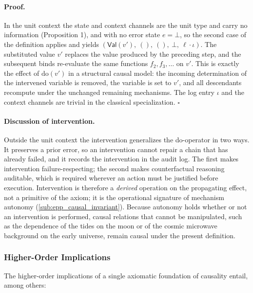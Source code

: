 \paragraph{Proof.}
In the unit context the state and context channels are the unit type and carry no information (Proposition 1), and with no error state $e = \bot$, so the second case of the definition applies and yields $(\mathsf{Val}(v'),\ (),\ (),\ \bot,\ \ell \cdot \iota)$. The substituted value $v'$ replaces the value produced by the preceding step, and the subsequent binds re-evaluate the same functions $f_2, f_3, \ldots$ on $v'$. This is exactly the effect of $\mathrm{do}(v')$ in a structural causal model: the incoming determination of the intervened variable is removed, the variable is set to $v'$, and all descendants recompute under the unchanged remaining mechanisms\cite{pearl2000causality}. The log entry $\iota$ and the context channels are trivial in the classical specialization. $\square$

\paragraph{Discussion of intervention.}
Outside the unit context the intervention generalizes the do-operator in two ways. It preserves a prior error, so an intervention cannot repair a chain that has already failed, and it records the intervention in the audit log. The first makes intervention failure-respecting; the second makes counterfactual reasoning auditable, which is required wherever an action must be justified before execution. Intervention is therefore a \emph{derived} operation on the propagating effect, not a primitive of the axiom; it is the operational signature of mechanism autonomy (\ref{sub:epp_causal_invariant}). Because autonomy holds whether or not an intervention is performed, causal relations that cannot be manipulated, such as the dependence of the tides on the moon or of the cosmic microwave background on the early universe, remain causal under the present definition.

\newpage
 


\subsubsection{Higher-Order Implications}
\label{sub:epp_higher_order_implications}


The higher-order implications of a single axiomatic foundation of causality entail, among others:

